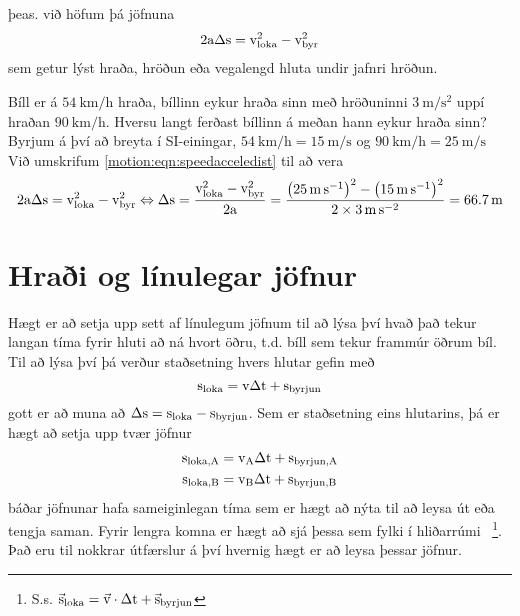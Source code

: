 þeas. við höfum þá jöfnuna
\begin{equation} \label{motion:eqn:speedacceledist}
	2\textrm{a} \Delta\textrm{s} =  \textrm{v}_\text{loka}^2 - \textrm{v}_\text{byr}^2
\end{equation}
sem getur lýst hraða, hröðun eða vegalengd hluta undir jafnri hröðun.
%
\begin{formalexample}
Bíll er á $\SI{54}{\km\per\hour}$ hraða, bíllinn eykur hraða sinn með hröðuninni
$\SI{3}{\m\per\s\squared}$ uppí hraðan $\SI{90}{\km\per\hour}$.  
Hversu langt ferðast bíllinn á meðan hann eykur hraða sinn?
\\[4 ex]
Byrjum á því að breyta í SI-einingar, 
$\SI{54}{\km\per\hour} = \SI{15}{\m\per\s}$ og
$\SI{90}{\km\per\hour} = \SI{25}{\m\per\s}$
Við umskrifum \ref{motion:eqn:speedacceledist} til að vera
\[
	2\uaccelea \Delta\ulengths =  \uspeed_\text{loka}^2 - \uspeed_\text{byr}^2
		\Leftrightarrow
		\Delta\ulengths = \frac{\uspeed_\text{loka}^2 - \uspeed_\text{byr}^2}{2\uaccelea}
			= 
				\frac{
					\left( \SI{25}{\m\per\s} \right)^2 
					- \left( \SI{15}{\m\per\s} \right)^2
					}{
					\num{2} \times \SI{3}{\m\per\s\squared}
					}
			= \SI{66.7}{\m}
\]
\end{formalexample}

\section[Línulegar jöfnur]{Hraði og línulegar jöfnur}
Hægt er að setja upp sett af línulegum jöfnum til að lýsa því hvað það tekur
langan tíma fyrir hluti að ná hvort öðru, t.d. bíll sem tekur frammúr öðrum bíl.
Til að lýsa því þá verður staðsetning hvers hlutar gefin með
\[
	\textrm{s}_\text{loka} = \textrm{v} \Delta\textrm{t} + \textrm{s}_\text{byrjun}
\]
gott er að muna að $\Delta \textrm{s} = \textrm{s}_\text{loka} 
- \textrm{s}_\text{byrjun}$.
Sem er staðsetning eins hlutarins, þá er hægt að setja upp tvær jöfnur
\begin{align*}
	\textrm{s}_\text{loka,A} &= \textrm{v}_\text{A} \Delta\textrm{t} 
		+ \textrm{s}_\text{byrjun,A} \\
	\textrm{s}_\text{loka,B} &= \textrm{v}_\text{B} \Delta\textrm{t} 
		+ \textrm{s}_\text{byrjun,B}
\end{align*}
báðar jöfnunar hafa sameiginlegan tíma sem er hægt að nýta til að leysa út eða tengja saman.
Fyrir lengra komna er hægt að sjá þessa sem fylki í hliðarrúmi%
~\footnote{S.s.  $\vec{\textrm{s}}_\text{loka} 
= \vec{\textrm{v}} \cdot \Delta\textrm{t} + \vec{\textrm{s}}_\text{byrjun} $}.
Það eru til nokkrar útfærslur á því hvernig hægt er að leysa þessar jöfnur.

